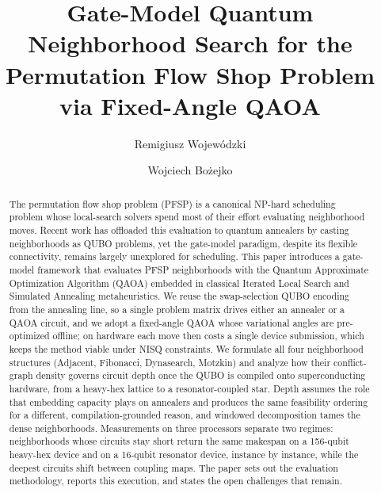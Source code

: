 \documentclass{svproc}
\newif\ifblind
\begin{document}
\mainmatter

\title{Gate-Model Quantum Neighborhood Search for the Permutation
       Flow Shop Problem via Fixed-Angle QAOA}

\ifblind
  \author{}
  \authorrunning{}
  \institute{}
\else
  \author{Remigiusz Wojew\'{o}dzki \and Wojciech Bo\.{z}ejko}
\fi

\maketitle

\begin{abstract}
The permutation flow shop problem (PFSP) is a canonical NP-hard
scheduling problem whose local-search solvers spend most of their
effort evaluating neighborhood moves. Recent work has offloaded this
evaluation to quantum annealers by casting neighborhoods as QUBO
problems, yet the gate-model paradigm, despite its flexible
connectivity, remains largely unexplored for scheduling. This paper
introduces a gate-model framework that evaluates PFSP neighborhoods with
the Quantum Approximate Optimization Algorithm (QAOA) embedded in
classical Iterated Local Search and Simulated Annealing metaheuristics.
We reuse the swap-selection QUBO encoding from the annealing
line, so a single problem matrix drives either an annealer or a QAOA
circuit, and we adopt a fixed-angle QAOA whose variational angles are
pre-optimized offline; on hardware each move then costs a single device
submission, which keeps the method viable under NISQ constraints. We
formulate all four neighborhood structures (Adjacent, Fibonacci,
Dynasearch, Motzkin) and analyze how their conflict-graph density
governs circuit depth once the QUBO is compiled onto superconducting
hardware, from a heavy-hex lattice to a resonator-coupled star. Depth
assumes the role that embedding capacity plays on annealers and produces
the same feasibility ordering for a different, compilation-grounded
reason, and windowed decomposition tames the dense neighborhoods.
Measurements on three processors separate two regimes: neighborhoods
whose circuits stay short return the same makespan on a 156-qubit
heavy-hex device and on a 16-qubit resonator device, instance by
instance, while the deepest circuits shift between coupling maps. The
paper sets out the evaluation methodology, reports this execution, and
states the open challenges that remain.
\end{abstract}
\end{document}
